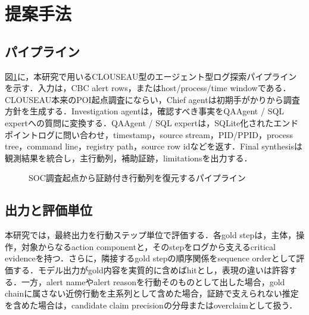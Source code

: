 ﻿

\section{提案手法}

\subsection{パイプライン}

図\ref{fig:pipeline}に，本研究で用いるCLOUSEAU型のエージェント型ログ探索パイプラインを示す．入力は，CBC alert rows，またはhost/process/time windowである．CLOUSEAU本来のPOI起点調査\cite{clouseau}にならい，Chief agentは初期手がかりから調査方針を生成する．Investigation agentは，確認すべき事実をQAAgent / SQL expertへの質問に変換する．QAAgent / SQL expertは，SQLite化されたエンドポイントログに問い合わせ，timestamp，source stream，PID/PPID，process tree，command line，registry path，source row idなどを返す．Final synthesisは観測結果を統合し，主行動列，補助証跡，limitationsを出力する．

\begin{figure}[t]
\centering
{}
\caption{SOC調査起点から証跡付き行動列を復元するパイプライン}
\label{fig:pipeline}
\end{figure}

\subsection{出力と評価単位}

本研究では，最終出力を行動ステップ単位で評価する．各gold stepは，主体，操作，対象からなるaction componentと，そのstepをログから支えるcritical evidenceを持つ．さらに，隣接するgold stepの順序関係をsequence orderとして評価する．モデル出力がgold内容を実質的に含めばhitとし，表現の違いは許容する．一方，alert nameやalert reasonを行動そのものとして出した場合，gold chainに属さない近傍行動を主系列として含めた場合，証跡で支えられない推定を含めた場合は，candidate claim precisionの分母またはoverclaimとして扱う．


